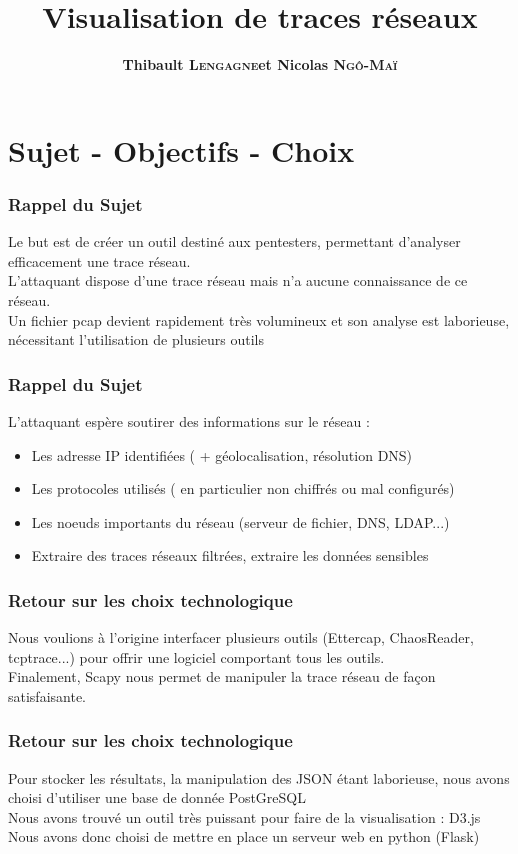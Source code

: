 \documentclass{beamer}
\title[Visualisation de traces réseaux]{Visualisation de traces réseaux}
\author{\textbf{Thibault \textsc{Lengagne}et Nicolas \textsc{Ngô-Maï}}}
\institute{Centrale Supélec - Campus de Rennes}
\begin{document}
  \begin{frame}
    \titlepage
  \end{frame}
  

 \section{Sujet - Objectifs - Choix}
  \begin{frame}
    \frametitle{Rappel du Sujet}
    Le but est de créer un outil destiné aux pentesters, permettant d'analyser efficacement une trace réseau. \\
    L'attaquant dispose d'une trace réseau mais n'a aucune connaissance de ce réseau.\\
    Un fichier pcap devient rapidement très volumineux et son analyse est laborieuse, nécessitant l'utilisation de plusieurs outils
  \end{frame}
  
  \begin{frame}
    \frametitle{Rappel du Sujet}
    L'attaquant espère soutirer des informations sur le réseau :
    \begin{itemize}
      \item Les adresse IP identifiées ( + géolocalisation, résolution DNS)
      \item Les protocoles utilisés ( en particulier non chiffrés ou mal configurés)
      \item Les noeuds importants du réseau (serveur de fichier, DNS, LDAP...)
      \item Extraire des traces réseaux filtrées, extraire les données sensibles
    \end{itemize}
  \end{frame}

  \begin{frame}
   \frametitle{Retour sur les choix technologique}
   Nous voulions à l'origine interfacer plusieurs outils (Ettercap, ChaosReader, tcptrace...) pour offrir une logiciel comportant tous les outils. \\
   Finalement, Scapy nous permet de manipuler la trace réseau de façon satisfaisante.
  \end{frame}
  
  \begin{frame}
  \frametitle{Retour sur les choix technologique}
   Pour stocker les résultats, la manipulation des JSON étant laborieuse, nous avons choisi d'utiliser une base de donnée PostGreSQL\\
   Nous avons trouvé un outil très puissant pour faire de la visualisation : D3.js \\
   Nous avons donc choisi de mettre en place un serveur web en python (Flask) \\
  \end{frame}
  
\end{document}
